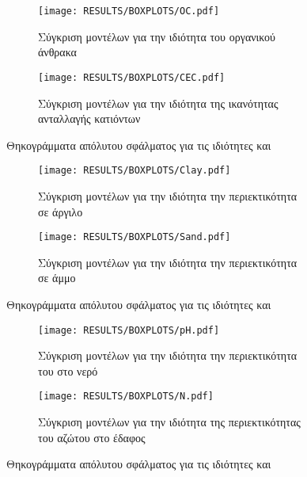 \begin{figure}[H]
    \begin{subfigure}{0.5\textwidth}
        \texttt{[image: RESULTS/BOXPLOTS/OC.pdf]}
        \caption{Σύγκριση μοντέλων για την ιδιότητα του οργανικού άνθρακα}
        \label{fig:OC_boxplot}
    \end{subfigure}
    \begin{subfigure}{0.5\textwidth}
        \texttt{[image: RESULTS/BOXPLOTS/CEC.pdf]}
        \caption{Σύγκριση μοντέλων για την ιδιότητα της ικανότητας ανταλλαγής κατιόντων}
        \label{fig:CEC_boxplot}
    \end{subfigure}
    \caption{Θηκογράμματα απόλυτου σφάλματος για τις ιδιότητες  και }
\end{figure}
\begin{figure}[H]
    \begin{subfigure}{0.5\textwidth}
        \texttt{[image: RESULTS/BOXPLOTS/Clay.pdf]}
        \caption{Σύγκριση μοντέλων για την ιδιότητα την περιεκτικότητα σε άργιλο}
        \label{fig:Clay_boxplot}
    \end{subfigure}
    \begin{subfigure}{0.5\textwidth}
        \texttt{[image: RESULTS/BOXPLOTS/Sand.pdf]}
        \caption{Σύγκριση μοντέλων για την ιδιότητα την περιεκτικότητα σε άμμο}
        \label{fig:Sand_boxplot}
    \end{subfigure}
    \caption{Θηκογράμματα απόλυτου σφάλματος για τις ιδιότητες  και }
\end{figure}
\begin{figure}[H]
    \begin{subfigure}{0.5\textwidth}
        \texttt{[image: RESULTS/BOXPLOTS/pH.pdf]}
        \caption{Σύγκριση μοντέλων για την ιδιότητα την περιεκτικότητα του  στο νερό}
        \label{fig:pH_boxplot}
    \end{subfigure}
    \begin{subfigure}{0.5\textwidth}
        \texttt{[image: RESULTS/BOXPLOTS/N.pdf]}
        \caption{Σύγκριση μοντέλων για την ιδιότητα της περιεκτικότητας του αζώτου στο έδαφος}
        \label{fig:N_boxplot}
    \end{subfigure}
    \caption{Θηκογράμματα απόλυτου σφάλματος για τις ιδιότητες  και }
\end{figure}

